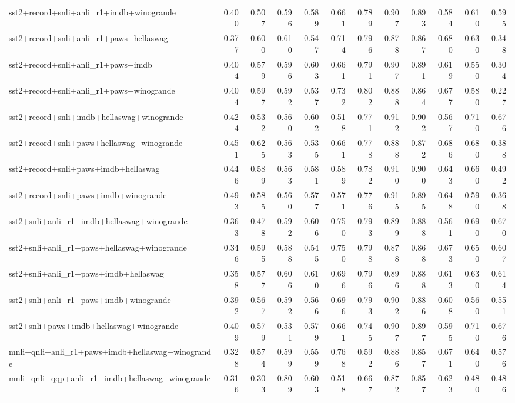 \begin{table}[t]
\begin{tabular}{lrrrrrrrrrrr}
    sst2+record+snli+anli\_r1+imdb+winogrande & 0.400 & 0.507 & 0.596 & 0.589 & 0.661 & 0.789 & 0.907 & 0.893 & 0.584 & 0.610 & 0.595 \\
    sst2+record+snli+anli\_r1+paws+hellaswag & 0.377 & 0.600 & 0.610 & 0.547 & 0.714 & 0.796 & 0.878 & 0.867 & 0.680 & 0.630 & 0.348 \\
    sst2+record+snli+anli\_r1+paws+imdb & 0.404 & 0.579 & 0.596 & 0.603 & 0.661 & 0.791 & 0.907 & 0.891 & 0.619 & 0.550 & 0.304 \\
    sst2+record+snli+anli\_r1+paws+winogrande & 0.404 & 0.597 & 0.592 & 0.537 & 0.732 & 0.802 & 0.888 & 0.864 & 0.677 & 0.580 & 0.227 \\
    sst2+record+snli+imdb+hellaswag+winogrande & 0.424 & 0.532 & 0.560 & 0.602 & 0.518 & 0.771 & 0.912 & 0.902 & 0.567 & 0.710 & 0.676 \\
    sst2+record+snli+paws+hellaswag+winogrande & 0.451 & 0.625 & 0.563 & 0.535 & 0.661 & 0.778 & 0.888 & 0.872 & 0.686 & 0.680 & 0.388 \\
    sst2+record+snli+paws+imdb+hellaswag & 0.446 & 0.589 & 0.563 & 0.581 & 0.589 & 0.782 & 0.910 & 0.900 & 0.643 & 0.660 & 0.492 \\
    sst2+record+snli+paws+imdb+winogrande & 0.493 & 0.585 & 0.560 & 0.577 & 0.571 & 0.776 & 0.915 & 0.895 & 0.648 & 0.590 & 0.368 \\
    sst2+snli+anli\_r1+imdb+hellaswag+winogrande & 0.363 & 0.478 & 0.592 & 0.606 & 0.750 & 0.793 & 0.899 & 0.888 & 0.561 & 0.690 & 0.670 \\
    sst2+snli+anli\_r1+paws+hellaswag+winogrande & 0.346 & 0.595 & 0.588 & 0.545 & 0.750 & 0.798 & 0.878 & 0.868 & 0.673 & 0.650 & 0.607 \\
    sst2+snli+anli\_r1+paws+imdb+hellaswag & 0.358 & 0.577 & 0.606 & 0.610 & 0.696 & 0.796 & 0.896 & 0.888 & 0.613 & 0.630 & 0.614 \\
    sst2+snli+anli\_r1+paws+imdb+winogrande & 0.392 & 0.567 & 0.592 & 0.566 & 0.696 & 0.793 & 0.902 & 0.886 & 0.608 & 0.560 & 0.551 \\
    sst2+snli+paws+imdb+hellaswag+winogrande & 0.409 & 0.579 & 0.531 & 0.579 & 0.661 & 0.745 & 0.907 & 0.897 & 0.595 & 0.710 & 0.676 \\
    \addlinespace
    mnli+qnli+anli\_r1+paws+imdb+hellaswag+winogrande & 0.328 & 0.574 & 0.599 & 0.559 & 0.768 & 0.592 & 0.886 & 0.857 & 0.671 & 0.640 & 0.576 \\
    mnli+qnli+qqp+anli\_r1+imdb+hellaswag+winogrande & 0.316 & 0.303 & 0.809 & 0.603 & 0.518 & 0.667 & 0.872 & 0.857 & 0.623 & 0.480 & 0.486 \\

\end{tabular}
\end{table}
